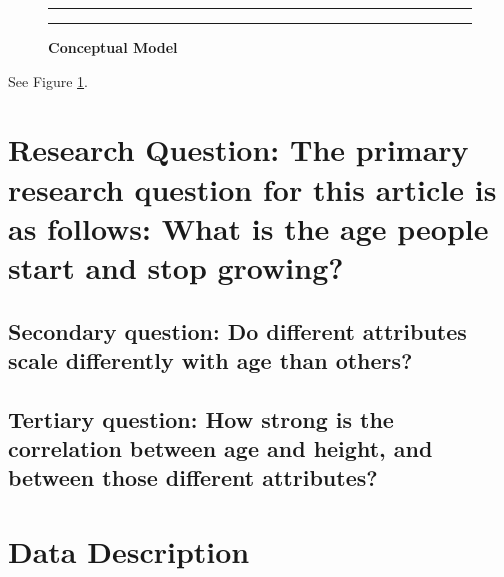 \documentclass[]{article}
\begin{document}
\begin{figure}[!ht]
    \hrule
    \caption{ \textbf{Conceptual Model} }
    \begin{center}
    \end{center}
    \label{fig:conceptual-mean}
    \hrule
\end{figure}
\newpage

See Figure \ref{fig:conceptual-mean}.

\section{Research Question:  The primary research question for this article is as follows: What is the age people start and stop growing? }
\label{sec:rq}

\subsection{Secondary question: Do different attributes scale differently with age than others? }
\label{sec:rq2}

\subsection{Tertiary question: How strong is the correlation between age and height, and between those different attributes?}
\label{sec:rq3}

\newpage

\section{Data Description}
\label{sec:data}
\end{document}
